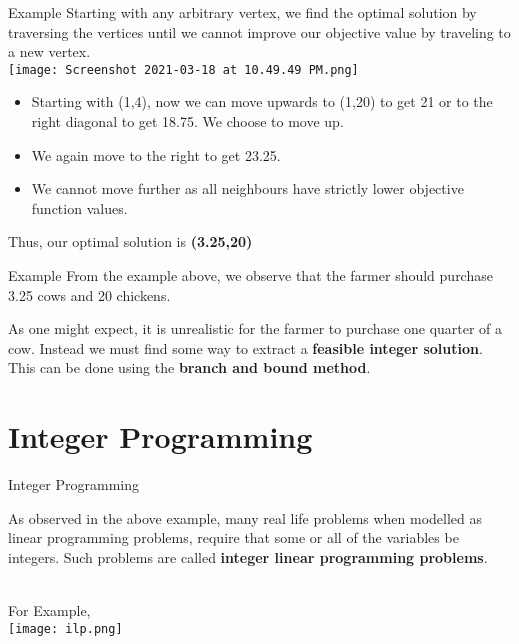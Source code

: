 \documentclass[9pt]{beamer}
\begin{document}
\begin{frame}{Example}
Starting with any arbitrary vertex, we find the optimal solution by traversing the vertices until we cannot improve our objective value by traveling to a new vertex.\\
\centering
\texttt{[image: Screenshot 2021-03-18 at 10.49.49 PM.png]}
\begin{itemize}
    \item Starting with (1,4), now we can move upwards to (1,20) to get 21 or to the right diagonal to get 18.75. We choose to move up.
    \pause
    \item We again move to the right to get 23.25. 
    \pause
    \item We cannot move further as all neighbours have strictly lower objective function values. 
\end{itemize}
\pause
Thus, our optimal solution is \textbf{(3.25,20)}
\end{frame}

\begin{frame}{Example}
From the example above, we observe that the farmer should purchase 3.25 cows and 20 chickens. \\
\vspace{1cm}

As one might expect, it is unrealistic for the farmer to purchase one quarter of a cow. Instead we must find some way to extract a \textbf{feasible integer solution}. This can be done using the \textbf{branch and bound method}.
\end{frame}


\section{Integer Programming}

\begin{frame}{Integer Programming}
\begin{definition}
As observed in the above example, many real life problems when modelled as linear programming problems, require that some or all of the variables be integers. Such problems are called \textbf{integer linear programming problems}.
\end{definition}\\
For Example,\\

\centering
\texttt{[image: ilp.png]}
\end{frame}
\end{document}
